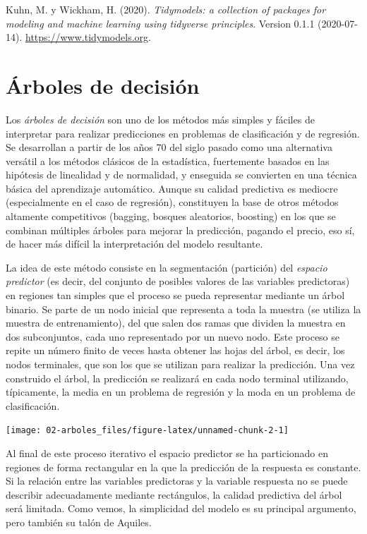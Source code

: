 \documentclass[]{book}
\theoremstyle{break}
\theoremstyle{definition}
\theoremstyle{definition}
\theoremstyle{definition}
\theoremstyle{remark}
\begin{document}
Kuhn, M. y Wickham, H. (2020). \emph{Tidymodels: a collection of
packages for modeling and machine learning using tidyverse principles}.
Version 0.1.1 (2020-07-14). \url{https://www.tidymodels.org}.

\chapter{Árboles de decisión}\label{trees}

Los \emph{árboles de decisión} son uno de los métodos más simples y
fáciles de interpretar para realizar predicciones en problemas de
clasificación y de regresión. Se desarrollan a partir de los años 70 del
siglo pasado como una alternativa versátil a los métodos clásicos de la
estadística, fuertemente basados en las hipótesis de linealidad y de
normalidad, y enseguida se convierten en una técnica básica del
aprendizaje automático. Aunque su calidad predictiva es mediocre
(especialmente en el caso de regresión), constituyen la base de otros
métodos altamente competitivos (bagging, bosques aleatorios, boosting)
en los que se combinan múltiples árboles para mejorar la predicción,
pagando el precio, eso sí, de hacer más difícil la interpretación del
modelo resultante.

La idea de este método consiste en la segmentación (partición) del
\emph{espacio predictor} (es decir, del conjunto de posibles valores de
las variables predictoras) en regiones tan simples que el proceso se
pueda representar mediante un árbol binario. Se parte de un nodo inicial
que representa a toda la muestra (se utiliza la muestra de
entrenamiento), del que salen dos ramas que dividen la muestra en dos
subconjuntos, cada uno representado por un nuevo nodo. Este proceso se
repite un número finito de veces hasta obtener las hojas del árbol, es
decir, los nodos terminales, que son los que se utilizan para realizar
la predicción. Una vez construido el árbol, la predicción se realizará
en cada nodo terminal utilizando, típicamente, la media en un problema
de regresión y la moda en un problema de clasificación.

\begin{center}\texttt{[image: 02-arboles\_files/figure-latex/unnamed-chunk-2-1]} \end{center}

Al final de este proceso iterativo el espacio predictor se ha
particionado en regiones de forma rectangular en la que la predicción de
la respuesta es constante. Si la relación entre las variables
predictoras y la variable respuesta no se puede describir adecuadamente
mediante rectángulos, la calidad predictiva del árbol será limitada.
Como vemos, la simplicidad del modelo es su principal argumento, pero
también su talón de Aquiles.
\end{document}
